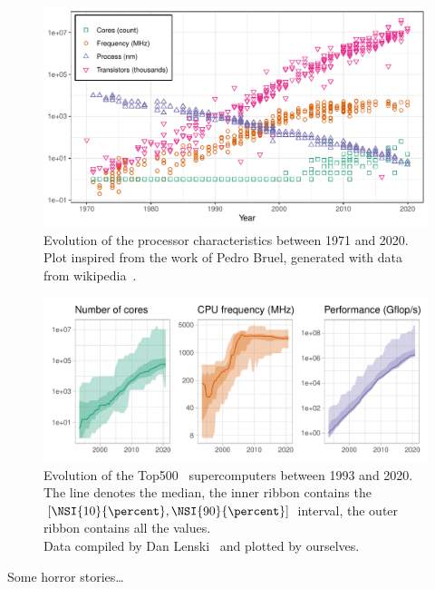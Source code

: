         \begin{figure}[htbp]
            \centering
            \includegraphics[width=\textwidth]{img/context/49_years.pdf}
            \caption{\label{fig:context:49_years}
            Evolution of the processor characteristics between 1971 and 2020. Plot inspired from the work of Pedro Bruel,
            generated with data from wikipedia~\cite{wiki2021chronology,wiki2021transistor}.}
        \end{figure}


        \begin{figure}[htbp]
            \centering
            \includegraphics[width=\textwidth]{img/context/top500.pdf}
            \caption{\label{fig:context:top500}
            Evolution of the Top500~\cite{top500} supercomputers between 1993 and 2020.  The line denotes the median, the inner ribbon
            contains the \([\NSI{10}{\percent}, \NSI{90}{\percent}]\) interval, the outer ribbon contains all the
            values.\\ Data compiled by Dan Lenski~\cite{top500_compiled} and plotted by ourselves.}
        \end{figure}


    \label{sec:increased_complexity}

        Some horror stories\cite{Petrini_2003}\dots
